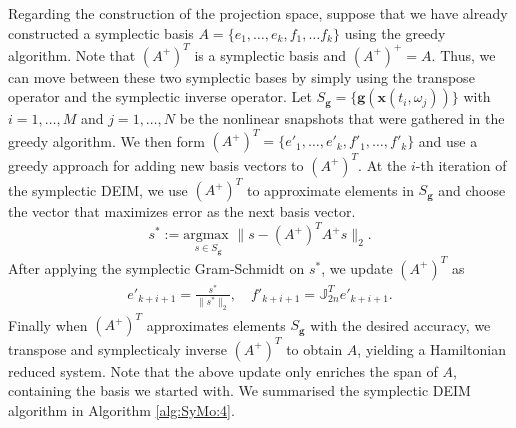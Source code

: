 Regarding the construction of the projection space, suppose that we have already constructed a symplectic basis $A=\{ e_1,\dots , e_k,f_1,\dots f_k \}$ using the greedy algorithm. Note that $(A^+)^T$ is a symplectic basis and $(A^+)^+=A$. Thus, we can move between these two symplectic bases by simply using the transpose operator and the symplectic inverse operator. Let $S_{\mathbf g} = \{ \mathbf g (\mathbf x(t_i,\omega_j)) \}$ with $i = 1,\dots,M$ and $ j = 1 ,\dots,N$ be the nonlinear snapshots that were gathered in the greedy algorithm. We then form $(A^+)^T = \{ e'_1,\dots, e'_k,f'_1,\dots,f'_k\}$ and use a greedy approach for adding new basis vectors to $(A^+)^T$. At the $i$-th iteration of the symplectic DEIM, we use $(A^+)^T$ to approximate elements in $S_{\mathbf g}$ and choose the vector that maximizes error as the next basis vector. 
\begin{equation}
	s^* := \underset{s \in S_{\mathbf g}}{\text{argmax }}\| s - (A^+)^T A^+ s \|_2.	
\end{equation}
After applying the symplectic Gram-Schmidt on $s^*$, we update $(A^+)^T$ as
\begin{equation}
\begin{aligned}
	e'_{k+i+1} = \frac{s^*}{\| s^* \|_2},\quad f'_{k+i+1} = \mathbb J_{2n}^T e'_{k+i+1}.
\end{aligned}
\end{equation}
Finally when $(A^+)^T$ approximates elements $S_{\mathbf g}$ with the desired accuracy, we transpose and symplecticaly inverse $(A^+)^T$ to obtain $A$, yielding a Hamiltonian reduced system. Note that the above update only enriches the span of $A$, containing the basis we started with. We summarised the symplectic DEIM algorithm in Algorithm \ref{alg:SyMo:4}.



